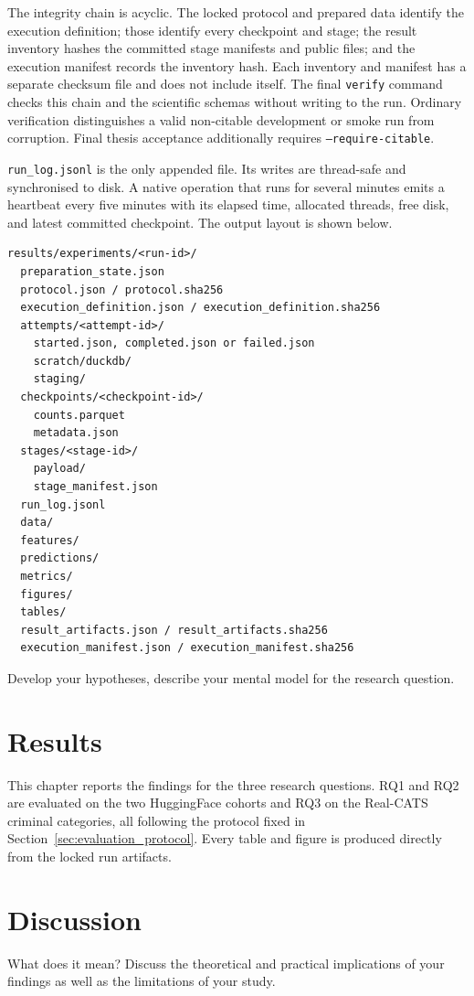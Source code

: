 \documentclass{thesisclass}
\begin{document}
The integrity chain is acyclic. The locked protocol and prepared data identify
the execution definition; those identify every checkpoint and stage; the
result inventory hashes the committed stage manifests and public files; and the
execution manifest records the inventory hash. Each inventory and manifest has
a separate checksum file and does not include itself. The final
\texttt{verify} command checks this chain and the scientific schemas without
writing to the run. Ordinary verification distinguishes a valid non-citable
development or smoke run from corruption. Final thesis acceptance additionally
requires \texttt{--require-citable}.

\texttt{run\_log.jsonl} is the only appended file. Its writes are thread-safe
and synchronised to disk. A native operation that runs for several minutes
emits a heartbeat every five minutes with its elapsed time, allocated threads,
free disk, and latest committed checkpoint. The output layout is shown below.

\begin{lstlisting}[caption={Locked Results artifact layout.},
  label={lst:filenames}]
results/experiments/<run-id>/
  preparation_state.json
  protocol.json / protocol.sha256
  execution_definition.json / execution_definition.sha256
  attempts/<attempt-id>/
    started.json, completed.json or failed.json
    scratch/duckdb/
    staging/
  checkpoints/<checkpoint-id>/
    counts.parquet
    metadata.json
  stages/<stage-id>/
    payload/
    stage_manifest.json
  run_log.jsonl
  data/
  features/
  predictions/
  metrics/
  figures/
  tables/
  result_artifacts.json / result_artifacts.sha256
  execution_manifest.json / execution_manifest.sha256
\end{lstlisting}


Develop your hypotheses, describe your mental model for the research question.


\chapter{Results}
\label{ch:results}

This chapter reports the findings for the three research questions. RQ1 and RQ2
are evaluated on the two HuggingFace cohorts and RQ3 on the Real-CATS criminal
categories, all following the protocol fixed in
Section~\ref{sec:evaluation_protocol}. Every table and figure is produced directly
from the locked run artifacts.



\chapter{Discussion} What does it mean? Discuss the theoretical and practical implications of your findings as well as the limitations of your study.
\end{document}
